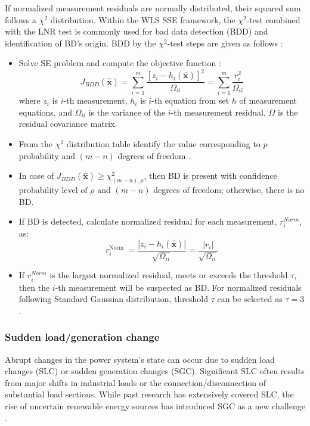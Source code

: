 If normalized measurement residuals are normally distributed, their squared sum follows a $\chi^2$ distribution. Within the WLS SSE framework, the $\chi^2$-test combined with the LNR test is commonly used for bad data detection (BDD) and identification of BD’s origin. BDD by the $\chi^2$-test steps are given as follows \autocite{gomez2017electric}: 
\begin{itemize}
    \item Solve SE problem and compute the objective function \autocite{7232283}:
        \begin{equation}
            J_{B D D}(\hat{\boldsymbol{x}})=\sum_{i=1}^{m} \frac{\left[z_{i}-h_{i}(\hat{\boldsymbol{x}})\right]^{2}}{\Omega_{i i}}=\sum_{i=1}^{m} \frac{r_{i}^{2}}{\Omega_{i i}}
        \end{equation}
        where $z_i$ is $i$-th measurement, $h_i$ is $i$-th equation from set $h$ of measurement  equations, and $\Omega_{ii}$ is the variance of  the $i$-th measurement residual, $\Omega$ is the residual covariance matrix.
        
    \item From the $\chi^2$ distribution table identify the value corresponding to $p$ probability and \((m-n)\) degrees of freedom \autocite{abur2004power}.

    \item In case of \(J_{B D D}(\hat{\boldsymbol{x}}) \geq \chi^2_{(m-n),\rho}\), then BD is present with confidence probability level of $\rho$ and \((m-n)\) degrees of freedom; otherwise, there is no BD.

    \item If BD is detected, calculate normalized residual for each measurement, $r^{Norm}_i$, as:
        \begin{equation}
        r_{i}^{\text {Norm }}=\frac{\left|z_{i}-h_{i}(\hat{\boldsymbol{x}})\right|}{\sqrt{\Omega_{i i}}}=\frac{\left|r_{i}\right|}{\sqrt{\Omega_{i i}}}
        \end{equation}

    \item If $r^{Norm}_i$ is the largest normalized residual, meets or exceeds the threshold $\tau$, then the $i$-th measurement will be suspected as BD. For normalized residuals following Standard Gaussian distribution, threshold $\tau$ can be selected as \(\tau = 3\).

\end{itemize}

\subsubsection{Sudden load/generation change}
Abrupt changes in the power system's state can occur due to sudden load changes (SLC) or sudden generation changes (SGC). Significant SLC often results from major shifts in industrial loads or the connection/disconnection of substantial load sections. While past research has extensively covered SLC, the rise of uncertain renewable energy sources has introduced SGC as a new challenge \autocite{Nishiya_1982}.

